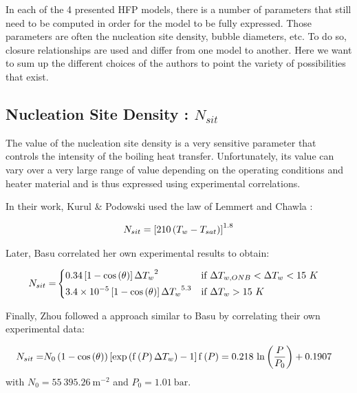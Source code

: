 In each of the 4 presented HFP models, there is a number of parameters that still need to be computed in order for the model to be fully expressed. Those parameters are often the nucleation site density, bubble diameters, etc. To do so, closure relationships are used and differ from one model to another. Here we want to sum up the different choices of the authors to point the variety of possibilities that exist.

\subsection{Nucleation Site Density : $N_{sit}$}

The value of the nucleation site density is a very sensitive parameter that controls the intensity of the boiling heat transfer. Unfortunately, its value can vary over a very large range of value depending on the operating conditions and heater material and is thus expressed using experimental correlations.

\npar
In their work, Kurul \& Podowski used the law of Lemmert and Chawla \cite{Lemmert}:

\begin{align}
N_{sit}=\left[ 210\left( T_{w}-T_{sat} \right) \right]^{1.8}
\end{align}


\npar
Later, Basu \cite{Basu} correlated her own experimental results to obtain:

\begin{align}
N_{sit}=&
\begin{dcases}
0.34\left[ 1-\mathrm{cos}\left( \theta \right) \right] {\Delta T_{w}}^{2} & \text{if } \Delta T_{w,ONB}<\Delta T_{w} < 15\ K\\
3.4\times 10^{-5}\left[ 1-\mathrm{cos}\left( \theta \right) \right] {\Delta T_{w}}^{5.3} & \text{if } \Delta T_{w} > 15\ K
\end{dcases}
\end{align}

\npar

\npar
Finally, Zhou \etal followed a approach similar to Basu \etal by correlating their own experimental data:

\begin{align}
N_{sit} =& N_{0}\left( 1-\mathrm{cos}\left( \theta \right) \right)\left[ \mathrm{exp}\left( \mathrm{f}\left( P \right) \Delta T_{w}  \right) -1  \right]
\mathrm{f}\left( P \right) = 0.218~\mathrm{ln}\left( \dfrac{P}{P_{0}} \right)+0.1907
\end{align}
with $N_{0}=55~395.26\ \mathrm{m}^{-2}$ and $P_{0}=1.01\ \mathrm{bar}$.



